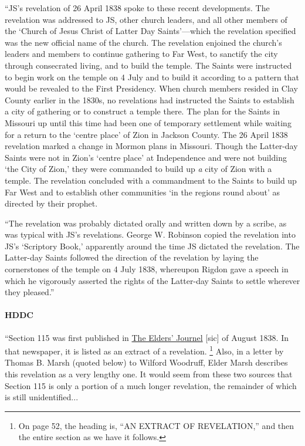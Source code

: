 			``JS's revelation of 26 April 1838 spoke to these recent developments. The revelation was addressed to JS, other church leaders, and all other members of the `Church of Jesus Christ of Latter Day Saints'---which the revelation specified was the new official name of the church. The revelation enjoined the church's leaders and members to continue gathering to Far West, to sanctify the city through consecrated living, and to build the temple. The Saints were instructed to begin work on the temple on 4 July and to build it according to a pattern that would be revealed to the First Presidency. When church members resided in Clay County earlier in the 1830s, no revelations had instructed the Saints to establish a city of gathering or to construct a temple there. The plan for the Saints in Missouri up until this time had been one of temporary settlement while waiting for a return to the `centre place' of Zion in Jackson County. The 26 April 1838 revelation marked a change in Mormon plans in Missouri. Though the Latter-day Saints were not in Zion's `centre place' at Independence and were not building `the City of Zion,' they were commanded to build up \textit{a} city of Zion with a temple. The revelation concluded with a commandment to the Saints to build up Far West and to establish other communities `in the regions round about' as directed by their prophet.
			
			``The revelation was probably dictated orally and written down by a scribe, as was typical with JS's revelations. George W. Robinson copied the revelation into JS's `Scriptory Book,' apparently around the time JS dictated the revelation. The Latter-day Saints followed the direction of the revelation by laying the cornerstones of the temple on 4 July 1838, whereupon Rigdon gave a speech in which he vigorously asserted the rights of the Latter-day Saints to settle wherever they pleased.''
			
		\paragraph{HDDC}
		
			``Section 115 was first published in \uline{The Elders' Journel} [sic] of August 1838. In that newspaper, it is listed as an extract of a revelation.%
				\footnote{%
					On page 52, the heading is, ``AN EXTRACT OF REVELATION,'' and then the entire section as we have it follows.
					}
			Also, in a letter by Thomas B. Marsh (quoted below) to Wilford Woodruff, Elder Marsh describes this revelation as a very lengthy one. It would seem from these two sources that Section 115 is only a portion of a much longer revelation, the remainder of which is still unidentified...
			
